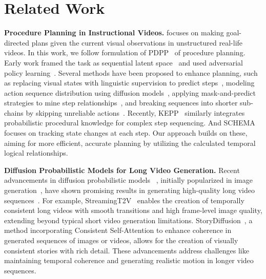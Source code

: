 \section{Related Work}
\label{gen_inst}
\textbf{Procedure Planning in Instructional Videos.} focuses on making goal-directed plans given the current visual observations in unstructured real-life videos. 
In this work, we follow formulation of PDPP~\citep{wang2023pdpp}  of procedure planning. 
Early work framed the task as sequential latent space~\citep{chang2020procedure} and used adversarial policy learning~\citep{bi2021procedure}. 
Several methods have been proposed to enhance planning, such as replacing visual states with linguistic supervision to predict steps~\citep{zhao2022p3iv}, modeling action sequence distribution using diffusion models~\citep{wang2023pdpp}, applying mask-and-predict strategies to mine step relationships~\citep{wang2023event}, and breaking sequences into shorter sub-chains by skipping unreliable actions~\citep{li2023skip}. 
Recently, KEPP~\citep{nagasinghe2024not} similarly integrates probabilistic procedural knowledge for complex step sequencing. And SCHEMA~\citep{niu2024schema} focuses on tracking state changes at each step. 
Our approach builds on these, aiming for more efficient, accurate planning by utilizing the calculated temporal logical relationships. 

\textbf{Diffusion Probabilistic Models for Long Video Generation.} Recent advancements in diffusion probabilistic models~\citep{croitoru2023diffusion} , initially popularized in image generation~\citep{rombach2022high}, have shown promising results in generating high-quality long video sequences~\citep{weng2024art,zhou2024upscale,jiang2024videobooth}. For example, StreamingT2V~\citep{henschel2024streamingt2v} enables the creation of temporally consistent long videos with smooth transitions and high frame-level image quality, extending beyond typical short video generation limitations. StoryDiffusion~\citep{zhou2024storydiffusion}, a method incorporating Consistent Self-Attention to enhance coherence in generated sequences of images or videos, allows for the creation of visually consistent stories with rich detail. These advancements address challenges like maintaining temporal coherence and generating realistic motion in longer video sequences. 